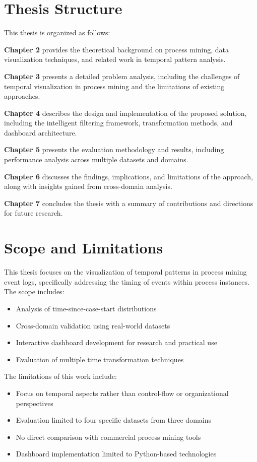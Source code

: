 \section{Thesis Structure}
\label{sec:thesis_structure}

This thesis is organized as follows:

\textbf{Chapter 2} provides the theoretical background on process mining, data visualization techniques, and related work in temporal pattern analysis.

\textbf{Chapter 3} presents a detailed problem analysis, including the challenges of temporal visualization in process mining and the limitations of existing approaches.

\textbf{Chapter 4} describes the design and implementation of the proposed solution, including the intelligent filtering framework, transformation methods, and dashboard architecture.

\textbf{Chapter 5} presents the evaluation methodology and results, including performance analysis across multiple datasets and domains.

\textbf{Chapter 6} discusses the findings, implications, and limitations of the approach, along with insights gained from cross-domain analysis.

\textbf{Chapter 7} concludes the thesis with a summary of contributions and directions for future research.

\section{Scope and Limitations}
\label{sec:scope_limitations}

This thesis focuses on the visualization of temporal patterns in process mining event logs, specifically addressing the timing of events within process instances. The scope includes:

\begin{itemize}
    \item Analysis of time-since-case-start distributions
    \item Cross-domain validation using real-world datasets
    \item Interactive dashboard development for research and practical use
    \item Evaluation of multiple time transformation techniques
\end{itemize}

The limitations of this work include:

\begin{itemize}
    \item Focus on temporal aspects rather than control-flow or organizational perspectives
    \item Evaluation limited to four specific datasets from three domains
    \item No direct comparison with commercial process mining tools
    \item Dashboard implementation limited to Python-based technologies
\end{itemize}
